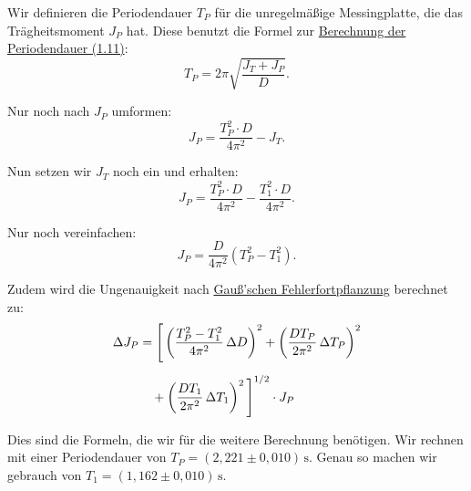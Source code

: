 Wir definieren die Periodendauer $T_P$ für die unregelmäßige Messingplatte, die das Trägheitsmoment $J_P$ hat. Diese benutzt die Formel zur \hyperref[eq:T_def]{Berechnung der Periodendauer (1.11)}:
\begin{equation}
    T_P = 2\pi \sqrt{\frac{J_T+J_P}{D}}.
\end{equation}

Nur noch nach $J_P$ umformen:
\begin{equation}
    J_P = \frac{T_P^2 \cdot D}{4\pi^2} - J_T.
\end{equation}

Nun setzen wir \hyperref[eq:j_t]{$J_T$} noch ein und erhalten:
\begin{equation}
    J_P = \frac{T_P^2 \cdot D}{4\pi^2} - \frac{T_1^2 \cdot D}{4\pi^2}.
\end{equation}

Nur noch vereinfachen:
\begin{equation}
    J_P = \frac{D}{4\pi^2}(T_P^2-T_1^2).
\end{equation}

Zudem wird die Ungenauigkeit nach \hyperref[eq:gauss_fehlfortpflanzung]{Gauß'schen Fehlerfortpflanzung} berechnet zu:
\begin{align}
\Delta J_P &= \Bigg[
    \left( \frac{T_P^2 - T_1^2}{4\pi^2} \, \Delta D \right)^2
    + \left( \frac{D T_P}{2\pi^2} \, \Delta T_P \right)^2 \notag \\[6pt]
&\quad
    + \left( \frac{D T_1}{2\pi^2} \, \Delta T_1 \right)^2
\Bigg]^{1/2} \cdot J_P
\end{align}

Dies sind die Formeln, die wir für die weitere Berechnung benötigen. Wir rechnen mit einer Periodendauer von $T_P = (2,221 \pm 0,010)\, \mathrm{s}$.
Genau so machen wir gebrauch von $T_1 = (1,162 \pm 0,010)\, \mathrm{s}$.